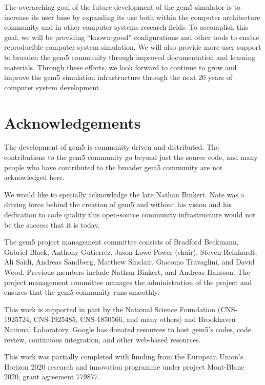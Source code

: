 \documentclass[sigconf,nonacm,screen=true]{acmart}
\begin{document}
The overarching goal of the future development of the gem5 simulator is to increase its user base by expanding its use both within the computer architecture community and in other computer systems research fields.
To accomplish this goal, we will be providing ``known-good'' configurations and other tools to enable reproducible computer system simulation.
We will also provide more user support to broaden the gem5 community through improved documentation and learning materials.
Through these efforts, we look forward to continue to grow and improve the gem5 simulation infrastructure through the next 20 years of computer system development.

\section{Acknowledgements}
\label{sec:acks}

The development of gem5 is community-driven and distributed.
The contributions to the gem5 community go beyond just the source code, and many people who have contributed to the broader gem5 community are not acknowledged here.

We would like to specially acknowledge the late Nathan Binkert.
Nate was a driving force behind the creation of gem5 and without his vision and his dedication to code quality this open-source community infrastructure would not be the success that it is today.

The gem5 project management committee consists of Bradford Beckmann, Gabriel Black, Anthony Gutierrez, Jason Lowe-Power (chair), Steven Reinhardt, Ali Saidi, Andreas Sandberg, Matthew Sinclair, Giacomo Travaglini, and David Wood.
Previous members include Nathan Binkert, and Andreas Hansson.
The project management committee manages the administration of the project and ensures that the gem5 community runs smoothly.

This work is supported in part by the National Science Foundation (CNS-1925724, CNS-1925485, CNS-1850566, and many others) and Brookhaven National Laboratory.
Google has donated resources to host gem5's codes, code review, continuous integration, and other web-based resources.

This work was partially completed with funding from the European Union's Horizon 2020 research and innovation programme under project Mont-Blanc 2020, grant agreement 779877.
\end{document}
